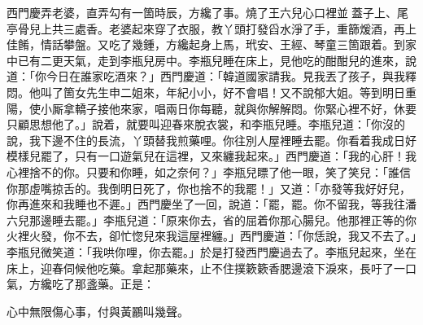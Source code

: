 西門慶弄老婆，直弄勾有一箇時辰，方纔了事。燒了王六兒心口裡並𣬼蓋子上、尾亭骨兒上共三處香。老婆起來穿了衣服，教丫頭打發舀水淨了手，重篩煖酒，再上佳餚，情話攀盤。又吃了幾鍾，方纔起身上馬，玳安、王經、琴童三箇跟着。到家中已有二更天氣，走到李瓶兒房中。李瓶兒睡在床上，見他吃的酣酣兒的進來，說道：「你今日在誰家吃酒來？」西門慶道：「韓道國家請我。見我丟了孩子，與我釋悶。他叫了箇女先生申二姐來，年紀小小，好不會唱！又不說郁大姐。等到明日重陽，使小厮拿轎子接他來家，唱兩日你每聽，就與你解解悶。你緊心裡不好，休要只顧思想他了。」{}說着，就要叫迎春來脫衣裳，和李瓶兒睡。李瓶兒道：「你沒的說，我下邊不住的長流，丫頭替我煎藥哩。你往別人屋裡睡去罷。你看着我成日好模樣兒罷了，只有一口遊氣兒在這裡，又來纏我起來。」西門慶道：「我的心肝！我心裡捨不的你。只要和你睡，如之奈何？」李瓶兒瞟了他一眼，笑了笑兒：「誰信你那虛嘴掠舌的。我倒明日死了，你也捨不的我罷！」又道：「亦發等我好好兒，你再進來和我睡也不遲。」西門慶坐了一回，說道：「罷，罷。你不留我，等我往潘六兒那邊睡去罷。」李瓶兒道：「原來你去，省的屈着你那心腸兒。他那裡正等的你火裡火發，你不去，卻忙惚兒來我這屋裡纏。」{}西門慶道：「你恁說，我又不去了。」李瓶兒微笑道：「我哄你哩，你去罷。」於是打發西門慶過去了。李瓶兒起來，坐在床上，迎春伺候他吃藥。拿起那藥來，止不住撲簌簌香腮邊滾下淚來，長吁了一口氣，{}方纔吃了那盞藥。正是：

\begin{myquote}
心中無限傷心事，付與黃鸝叫幾聲。
\end{myquote}

